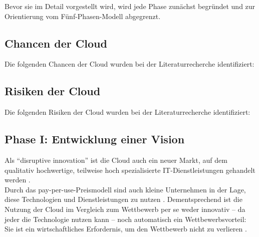 Bevor sie im Detail vorgestellt wird, wird jede Phase zunächst begründet 
und zur Orientierung vom Fünf-Phasen-Modell abgegrenzt.
\begin{comment}
Das Fünf-Phasen-Modell beginnt mit einer technischen und 
wirtschaftlichen Machbarkeitsstudie. Die Migration einer On-Premise-Software in 
die Cloud bedeutet für das migrierende Unternehmen die Erschließung eines ganz 
neuen Marktes, der sich grundlegend vom bekannten Markt unterscheidet. Aus 
diesem Grund kann das Cloud-Produkt sich grundlegend vom bisherigen 
On-Premise-Produkt unterscheiden. Deshalb wird 
\citeflow{how_saas_changes_an_isvs_business} und 
\citeflow{towards_modelling_a_cloud_applications_life_cycle} eine zusätzliche 
Phase vorgeschlagen, in der eine Vision der künftigen Cloud-Lösung entworfen 
wird. Mit dieser Vision kann der Leistungsumfang abgeschätzt werden und auch, 
wie sich das Unternehmen verändern muss, um dieser Vision zu entsprechen. 
(Kapitel~\ref{cha:phaseI})\\
\end{comment}

\subsection{Chancen der Cloud}
Die folgenden Chancen der Cloud wurden bei der Literaturrecherche identifiziert:

\subsection{Risiken der Cloud}
Die folgenden Risiken der Cloud wurden bei der Literaturrecherche identifiziert:




\subsection{Phase I: Entwicklung einer Vision}
\label{cha:phaseI}

Als "`disruptive innovation"' ist die Cloud auch ein neuer Markt, auf dem 
qualitativ hochwertige, teilweise hoch spezialisierte IT-Dienstleistungen 
gehandelt werden . \\
Durch das pay-per-use-Preismodell sind auch kleine Unternehmen in der Lage, 
diese Technologien und Dienstleistungen zu nutzen 
. Dementsprechend ist die Nutzung der Cloud im Vergleich zum Wettbewerb per se 
weder  innovativ -- da jeder die Technologie nutzen kann -- noch 
automatisch ein Wettbewerbsvorteil: Sie ist ein wirtschaftliches Erfordernis, 
um den Wettbewerb nicht zu verlieren 
.

